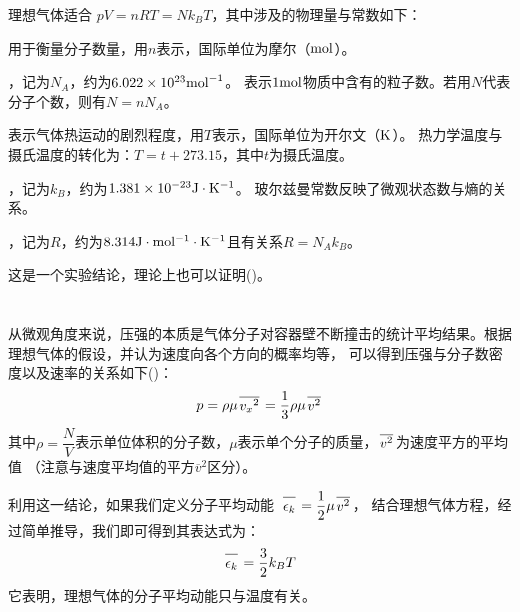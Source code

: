         理想气体适合 \quad$pV=nRT=Nk_{B}T$，其中涉及的物理量与常数如下：
        \begin{Itemize}
            \item {} 用于衡量分子数量，用$n$表示，国际单位为摩尔（$\rm{mol}$）。
            \item {}，记为$N_{A}$，约为$6.022\times 10^{23}\rm{mol}^{-1}$。
            表示$1\rm{mol}$物质中含有的粒子数。若用$N$代表分子个数，则有$N=nN_{A}$。
            \item {} 表示气体热运动的剧烈程度，用$T$表示，国际单位为开尔文（$\rm{K}$）。
            热力学温度与摄氏温度的转化为：$T = t + 273.15$，其中$t$为摄氏温度。
            \item {}，记为$k_{B}$，约为$1.381\times 10^{-23}\rm{J}\cdot K^{-1}$。
            玻尔兹曼常数反映了微观状态数与熵的关系。
            \item {}，记为$R$，约为$8.314\rm{J}\cdot mol^{-1}\cdot K^{-1}$且有关系$R=N_{A}k_{B}$。
        \end{Itemize}

        这是一个实验结论，理论上也可以证明()。
    \section[分子动理论]{}
        \subsection[压强的微观解释]{}
            从微观角度来说，压强的本质是气体分子对容器壁不断撞击的统计平均结果。根据理想气体的假设，并认为速度向各个方向的概率均等，
            可以得到压强与分子数密度以及速率的关系如下()：
            \begin{equation}
                p = \rho \mu \upperline{v_{x}{}^{2}}=\frac{1}{3}\rho \mu \upperline{v^{2}}
                \nonumber
            \end{equation}
            其中$\rho = \dfrac{N}{V}$表示单位体积的分子数，$\mu$表示单个分子的质量，$\upperline{v^{2}}$为速度平方的平均值
            （注意与速度平均值的平方$\overline{v}{}^2$区分）。

            利用这一结论，如果我们定义分子平均动能\ $\upperline{\epsilon_{k}} = \dfrac{1}{2} \mu \upperline{v^{2}}$，
            结合理想气体方程，经过简单推导，我们即可得到其表达式为：
            \begin{equation}
                \upperline{\epsilon_{k}} = \frac{3}{2}k_{B}T
                \nonumber
            \end{equation}
            它表明，理想气体的分子平均动能只与温度有关。
